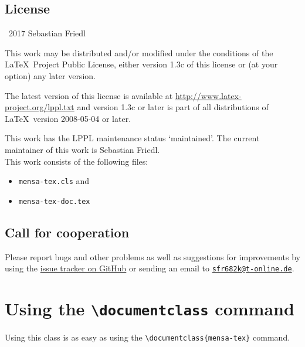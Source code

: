 \documentclass[11pt]{ltxdoc}
\begin{document}
	\subsection*{License}
	\begin{small}
		\textcopyright\ 2017 Sebastian Friedl
		
		\smallskip
		This work may be distributed and/or modified under the conditions of the \LaTeX\ Project Public License, either version 1.3c of this license or (at your option) any later version.
		
		\smallskip
		The latest version of this license is available at \url{http://www.latex-project.org/lppl.txt} and version 1.3c or later is part of all distributions of \LaTeX\ version 2008-05-04 or later.
		
		\smallskip
		This work has the LPPL maintenance status \enquote*{maintained}. The current maintainer of this work is Sebastian Friedl. \\
		This work consists of the following files:
		\begin{itemize} \itemsep 0pt
			\item \texttt{mensa-tex.cls} and
			\item \texttt{mensa-tex-doc.tex}
		\end{itemize}
	\end{small}


	\subsection*{Call for cooperation}
	Please report bugs and other problems as well as suggestions for improvements by using the \href{https://github.com/SFr682k/mensa-tex/issues}{issue tracker on GitHub} or sending an email to \href{mailto:sfr682k@t-online.de}{\texttt{sfr682k@t-online.de}}.


	\clearpage
	
		
		
	
	\section{Using the \texttt{\textbackslash documentclass} command} \label{sec:docclass}
	Using this class is as easy as using the \verb|\documentclass{mensa-tex}| command.
	
\end{document}
